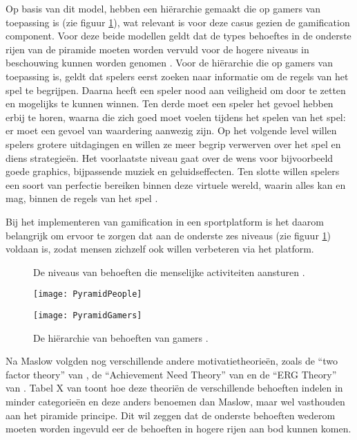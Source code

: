 Op basis van dit model, hebben \textcite{Siang2003} een hiërarchie gemaakt die op gamers van toepassing is (zie figuur \ref{fig:gamers-hierarchy}), wat relevant is voor deze casus gezien de gamification component.
Voor deze beide modellen geldt dat de types behoeftes in de onderste rijen van de piramide moeten worden vervuld voor de hogere niveaus in beschouwing kunnen worden genomen \autocite{Richter2014}.
Voor de hiërarchie die op gamers van toepassing is, geldt dat spelers eerst zoeken naar informatie om de regels van het spel te begrijpen. Daarna heeft een speler nood aan veiligheid om door te zetten en mogelijks te kunnen winnen. Ten derde moet een speler het gevoel hebben erbij te horen, waarna die zich goed moet voelen tijdens het spelen van het spel: er moet een gevoel van waardering aanwezig zijn. Op het volgende level willen spelers grotere uitdagingen en willen ze meer begrip verwerven over het spel en diens strategieën. Het voorlaatste niveau gaat over de wens voor bijvoorbeeld goede graphics, bijpassende muziek en geluidseffecten. Ten slotte willen spelers een soort van perfectie bereiken binnen deze virtuele wereld, waarin alles kan en mag, binnen de regels van het spel \autocite{Greitzer2007, Siang2003}.

Bij het implementeren van gamification in een sportplatform is het daarom belangrijk om ervoor te zorgen dat aan de onderste zes niveaus (zie figuur \ref{fig:gamers-hierarchy}) voldaan is, zodat mensen zichzelf ook willen verbeteren via het platform.

\begin{figure}[htbp]
    \begin{minipage}[t]{0.48\linewidth} %
        \centering
        \caption[Behoeften-hiërarchie algemeen]{De  niveaus van behoeften die menselijke activiteiten aansturen \autocite{Lilienfeld2014}.}
        \texttt{[image: PyramidPeople]}
        \label{fig:people-hierarchy}
    \end{minipage}
    \hfill
    \begin{minipage}[t]{0.48\linewidth} %
        \centering
        \caption[Behoeften-hiërarchie gamers]{De hiërarchie van behoeften van gamers \autocite{Richter2014}.}
        \texttt{[image: PyramidGamers]}
        \label{fig:gamers-hierarchy}
    \end{minipage}
\end{figure}

Na Maslow volgden nog verschillende andere motivatietheorieën, zoals de “two factor theory” van \textcite{Herzberg1959}, de “Achievement Need Theory” van \textcite{McClelland1961} en de “ERG Theory” van \textcite{Alderfer1969}. Tabel X van \textcite{Benke2019} toont hoe deze theoriën de verschillende behoeften indelen in minder categorieën en deze anders benoemen dan Maslow, maar wel vasthouden aan het piramide principe. Dit wil zeggen dat de onderste behoeften wederom moeten worden ingevuld eer de behoeften in hogere rijen aan bod kunnen komen.

